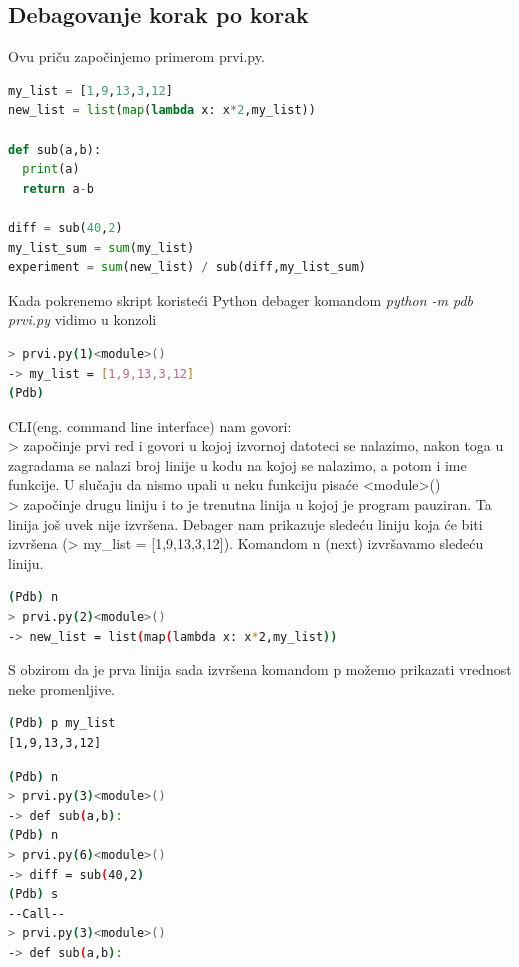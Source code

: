 \documentclass[a4paper]{article}
\begin{document}
\subsection{Debagovanje korak po korak}
Ovu priču započinjemo primerom prvi.py.
\begin{lstlisting}[language = python, caption = {Primer za ilustrovanje narednih komandi (prvi.py)}]
my_list = [1,9,13,3,12]
new_list = list(map(lambda x: x*2,my_list))

def sub(a,b):
  print(a)
  return a-b
  
diff = sub(40,2)
my_list_sum = sum(my_list)
experiment = sum(new_list) / sub(diff,my_list_sum)
\end{lstlisting}
Kada pokrenemo skript koristeći Python debager komandom \emph{python -m pdb prvi.py} vidimo u konzoli
\begin{lstlisting}[language = bash, caption={Ulazak u Pdb prompt}]
> prvi.py(1)<module>()
-> my_list = [1,9,13,3,12]
(Pdb)
\end{lstlisting}
CLI(eng. command line interface) nam govori:\\
> započinje prvi red i govori u kojoj izvornoj datoteci se nalazimo, nakon toga u zagradama se nalazi broj linije u kodu na kojoj se nalazimo, a potom i ime funkcije. U slučaju da nismo upali u neku funkciju pisaće <module>()\\
\textendash>  započinje drugu liniju i to je trenutna linija u kojoj je program pauziran. Ta linija još uvek nije izvršena. Debager nam prikazuje sledeću liniju koja će biti izvršena 
(\textendash> my\_list = [1,9,13,3,12]).
Komandom n (next) izvršavamo sledeću liniju.
\begin{lstlisting}[language = bash, caption={Izvršavanje prve linije k\^{o}da}]
(Pdb) n
> prvi.py(2)<module>()
-> new_list = list(map(lambda x: x*2,my_list))
\end{lstlisting}
S obzirom da je prva linija sada izvršena komandom p možemo prikazati vrednost neke
 promenljive.
\begin{lstlisting}[language = bash, caption={Štampanje promenljive \emph{my\_list}}]
(Pdb) p my_list
[1,9,13,3,12]
\end{lstlisting}
\begin{lstlisting}[language = bash, caption={Izvršavanje naredne dve linije i ulazak u funkciju \emph{sub(40, 2)}}]
(Pdb) n
> prvi.py(3)<module>()
-> def sub(a,b):
(Pdb) n
> prvi.py(6)<module>()
-> diff = sub(40,2)
(Pdb) s
--Call--
> prvi.py(3)<module>()
-> def sub(a,b):
\end{lstlisting}
\end{document}
